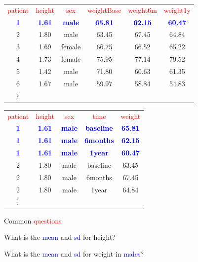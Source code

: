 \documentclass{presentatiesmetlogo}
\newcommand{\bluebf}[1]{\textcolor{blue}{\textbf{#1}}}
\begin{document}
\eitem
\begin{tabular}{cccccc}
\textcolor{red}{patient} &  \textcolor{red}{height} &   \textcolor{red}{sex} &  \textcolor{red}{weightBase} & \textcolor{red}{weight6m}  & \textcolor{red}{weight1y}\\
  \bluebf{1} &  \bluebf{1.61}  & \bluebf{male}    &  \bluebf{65.81}   & \bluebf{62.15}  &  \bluebf{60.47}\\
  2 &  1.80  & male   &   63.45  &  67.45  &  64.84\\
 3  & 1.69 &female    &  66.75   & 66.52  &  65.22\\
 4  & 1.73& female    &  75.95  &  77.14  &  79.52\\
   5 &  1.42 &  male  &    71.80  &  60.63 &   61.35\\
  6 &  1.67 &  male  &    59.97  &  58.84 &   54.83\\
 \vdots &&&&
\end{tabular}
\begin{tabular}{ccccc}
\textcolor{red}{patient} &  \textcolor{red}{height} &   \textcolor{red}{sex} &  \textcolor{red}{time} & \textcolor{red}{weight}  \\
   \bluebf{1}  & \bluebf{1.61} & \bluebf{male} & \bluebf{baseline} &  \bluebf{65.81}\\
   \bluebf{1}  & \bluebf{1.61} & \bluebf{male} & \bluebf{6months} & \bluebf{62.15}\\
 \bluebf{1} &  \bluebf{1.61} & \bluebf{male}  &  \bluebf{1year} & \bluebf{60.47}\\
   2  & 1.80 &male& baseline & 63.45\\
    2 &  1.80 &male&  6months&  67.45\\
  2  & 1.80 &male  &  1year & 64.84\\
 \vdots &&&&
\end{tabular}
\bitem
\item Common \textcolor{red}{questions}
\newline
\bitemt
\item {}
\item What is the  \textcolor{blue}{mean} and \textcolor{blue}{sd} for height?
\item What is the \textcolor{blue}{mean} and \textcolor{blue}{sd} for weight in \textcolor{blue}{males}?
\end{document}
